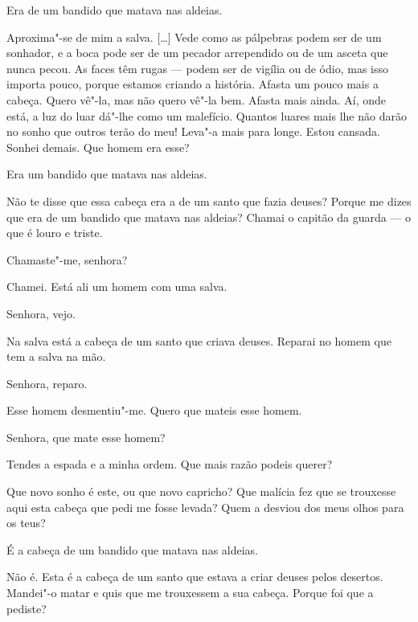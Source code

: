  Era de um bandido que matava nas aldeias.

 Aproxima"-se de mim a salva. [\ldots{}] Vede como as pálpebras
podem ser de um sonhador, e a boca pode ser de um pecador arrependido
ou de um asceta que nunca pecou. As faces têm rugas --- podem ser de
vigília ou de ódio, mas isso importa pouco, porque estamos criando a
história. Afasta um pouco mais a cabeça. Quero vê"-la, mas não quero
vê"-la bem. Afasta mais ainda. Aí, onde está, a luz do luar dá"-lhe
como um malefício. Quantos luares mais lhe não darão no sonho que
outros terão do meu! Leva"-a mais para longe. Estou cansada. Sonhei
demais. Que homem era esse? 

 Era um bandido que matava nas aldeias.

 Não te disse que essa cabeça era a de um santo que fazia
deuses? Porque me dizes que era de um bandido que matava nas aldeias?
Chamai o capitão da guarda --- o que é louro e triste.




 Chamaste"-me, senhora?

 Chamei. Está ali um homem com uma salva.

 Senhora, vejo.

 Na salva está a cabeça de um santo que criava deuses.
Reparai no homem que tem a salva na mão. 

 Senhora, reparo.

 Esse homem desmentiu"-me. Quero que mateis esse homem.

 Senhora, que mate esse homem?

 Tendes a espada e a minha ordem. Que mais razão podeis
querer?


 Que novo sonho é este, ou que novo capricho? Que malícia
fez que se trouxesse aqui esta cabeça que pedi me fosse levada? Quem
a desviou dos meus olhos para os teus?

 É a cabeça de um bandido que matava nas aldeias.

 Não é. Esta é a cabeça de um santo que estava a criar
deuses pelos desertos. Mandei"-o matar e quis que me trouxessem a sua
cabeça. Porque foi que a pediste?

